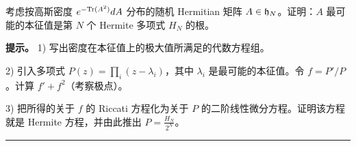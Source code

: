 \begin{exercise} 考虑按高斯密度 $e^{-{\rm Tr}(A^2)}dA$ 分布的随机 Hermitian 矩阵 $A\in
{\frak h}_N$。证明：$A$ 最可能的本征值是第 $N$ 个 Hermite 多项式 $H_N$ 的根。

\textbf{提示。} 1) 写出密度在本征值上的极大值所满足的代数方程组。

2) 引入多项式 $P(z)=\prod_i(z-\lambda_i)$，其中 $\lambda_i$ 是最可能的本征值。令 $f=P'/P$。计算 $f'+f^2$（考察极点）。

3) 把所得的关于 $f$ 的 Riccati 方程化为关于 $P$ 的二阶线性微分方程。证明该方程就是 Hermite 方程，并由此推出 $P=\frac{H_N}{2^N}$。
\end{exercise} 

\bigskip
\noindent\rule{\textwidth}{0.6pt}
